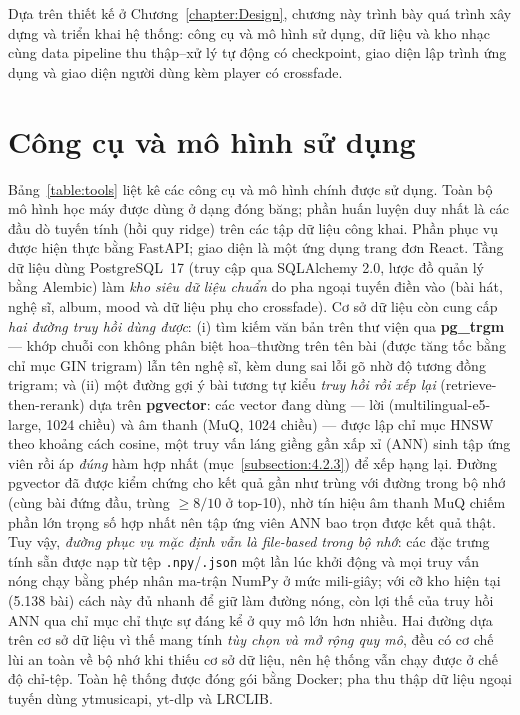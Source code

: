 \documentclass[../DoAn.tex]{subfiles}
\begin{document}
Dựa trên thiết kế ở Chương~\ref{chapter:Design}, chương này trình bày quá trình xây dựng và triển khai hệ thống: công cụ và mô hình sử dụng, dữ liệu và kho nhạc cùng data pipeline thu thập--xử lý tự động có checkpoint, giao diện lập trình ứng dụng và giao diện người dùng kèm player có crossfade.

\section{Công cụ và mô hình sử dụng}
\label{section:4.3}
Bảng~\ref{table:tools} liệt kê các công cụ và mô hình chính được sử dụng. Toàn bộ mô hình học máy được dùng ở dạng đóng băng; phần huấn luyện duy nhất là các đầu dò tuyến tính (hồi quy ridge) trên các tập dữ liệu công khai. Phần phục vụ được hiện thực bằng FastAPI; giao diện là một ứng dụng trang đơn React. Tầng dữ liệu dùng PostgreSQL~17 (truy cập qua SQLAlchemy 2.0, lược đồ quản lý bằng Alembic) làm \textit{kho siêu dữ liệu chuẩn} do pha ngoại tuyến điền vào (bài hát, nghệ sĩ, album, mood và dữ liệu phụ cho crossfade). Cơ sở dữ liệu còn cung cấp \textit{hai đường truy hồi dùng được}: (i) tìm kiếm văn bản trên thư viện qua \textbf{pg\_trgm} --- khớp chuỗi con không phân biệt hoa--thường trên tên bài (được tăng tốc bằng chỉ mục GIN trigram) lẫn tên nghệ sĩ, kèm dung sai lỗi gõ nhờ độ tương đồng trigram; và (ii) một đường gợi ý bài tương tự kiểu \textit{truy hồi rồi xếp lại} (retrieve-then-rerank) dựa trên \textbf{pgvector}: các vector đang dùng --- lời (multilingual-e5-large, 1024 chiều) và âm thanh (MuQ, 1024 chiều) --- được lập chỉ mục HNSW theo khoảng cách cosine, một truy vấn láng giềng gần xấp xỉ (ANN) sinh tập ứng viên rồi áp \textit{đúng} hàm hợp nhất (mục~\ref{subsection:4.2.3}) để xếp hạng lại. Đường pgvector đã được kiểm chứng cho kết quả gần như trùng với đường trong bộ nhớ (cùng bài đứng đầu, trùng $\geq 8/10$ ở top-10), nhờ tín hiệu âm thanh MuQ chiếm phần lớn trọng số hợp nhất nên tập ứng viên ANN bao trọn được kết quả thật. Tuy vậy, \textit{đường phục vụ mặc định vẫn là file-based trong bộ nhớ}: các đặc trưng tính sẵn được nạp từ tệp \texttt{.npy}/\texttt{.json} một lần lúc khởi động và mọi truy vấn nóng chạy bằng phép nhân ma-trận NumPy ở mức mili-giây; với cỡ kho hiện tại (5.138 bài) cách này đủ nhanh để giữ làm đường nóng, còn lợi thế của truy hồi ANN qua chỉ mục chỉ thực sự đáng kể ở quy mô lớn hơn nhiều. Hai đường dựa trên cơ sở dữ liệu vì thế mang tính \textit{tùy chọn và mở rộng quy mô}, đều có cơ chế lùi an toàn về bộ nhớ khi thiếu cơ sở dữ liệu, nên hệ thống vẫn chạy được ở chế độ chỉ-tệp. Toàn hệ thống được đóng gói bằng Docker; pha thu thập dữ liệu ngoại tuyến dùng ytmusicapi, yt-dlp và LRCLIB.
\end{document}
